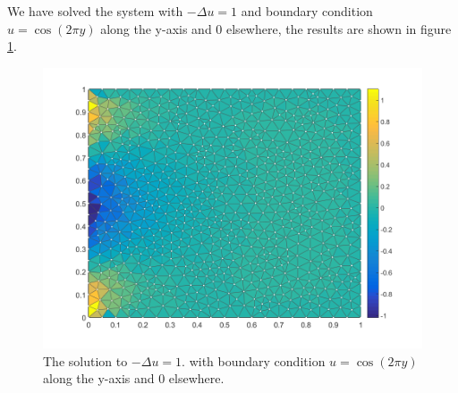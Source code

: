 \section{}

We have solved the system with $-\Delta u = 1$ and boundary condition $u = \cos(2\pi y)$ along the y-axis and $0$ elsewhere, the results are shown in figure \ref{fig:4}.
\begin{figure}[!Hh]
  \centering
  \includegraphics[width=\textwidth]{./plots/problem_04_result}
  \caption{The solution to $-\Delta u = 1$. with boundary condition $u = \cos(2\pi y)$ along the y-axis and $0$ elsewhere.}
  \label{fig:4}
\end{figure}


